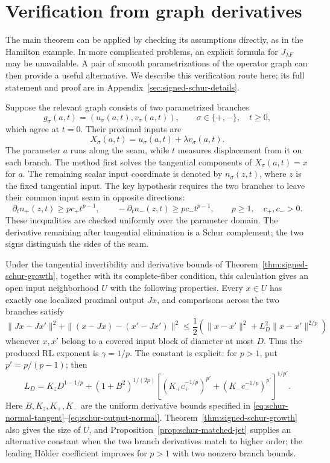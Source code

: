 \section{Verification from graph derivatives}
\label{sec:schur-seam-verifier}

The main theorem can be applied by checking its assumptions directly, as in
the Hamilton example.  In more complicated problems, an explicit formula
for \(J_{\lambda F}\) may be unavailable.  A pair of smooth parametrizations
of the operator graph can then provide a useful alternative.  We describe
this verification route here; its full statement and proof are in
Appendix~\ref{sec:signed-schur-details}.

Suppose the relevant graph consists of two parametrized branches
\[
 g_\sigma(a,t)=(u_\sigma(a,t),v_\sigma(a,t)),
 \qquad \sigma\in\{+,-\},\quad t\ge0,
\]
which agree at \(t=0\).  Their proximal inputs are
\[
 X_\sigma(a,t)=u_\sigma(a,t)+\lambda v_\sigma(a,t).
\]
The parameter \(a\) runs along the seam, while \(t\) measures displacement
from it on each branch.  The method first solves the tangential components
of \(X_\sigma(a,t)=x\) for \(a\).  The remaining scalar input coordinate
is denoted by \(n_\sigma(z,t)\), where \(z\) is the fixed tangential input.
The key hypothesis requires the two branches to leave their common input
seam in opposite directions:
\[
 \partial_t n_+(z,t)\ge p c_+t^{p-1},\qquad
 -\partial_t n_-(z,t)\ge p c_-t^{p-1},
 \qquad p\ge1,\quad c_+,c_->0.
\]
These inequalities are checked uniformly over the parameter domain.  The
derivative remaining after tangential elimination is a Schur complement;
the two signs distinguish the sides of the seam.

Under the tangential invertibility and derivative bounds of
Theorem~\ref{thm:signed-schur-growth}, together with its complete-fiber
condition, this calculation gives an open input neighborhood \(U\) with
the following properties.  Every \(x\in U\) has exactly one localized
proximal output \(Jx\), and comparisons across the two branches satisfy
\begin{equation}
 \|Jx-Jx'\|^2+
 \|(x-Jx)-(x'-Jx')\|^2
 \le\frac12\left(\|x-x'\|^2+
                     L_D^2\|x-x'\|^{2/p}\right)
 \label{eq:schur-main-J-estimate}
\end{equation}
whenever \(x,x'\) belong to a covered input block of diameter at most
\(D\).  Thus the produced RL exponent is \(\gamma=1/p\).
The constant is explicit: for \(p>1\), put \(p'=p/(p-1)\); then
\[
 L_D=K_zD^{1-1/p}+(1+B^2)^{1/(2p)}
 \left[(K_+c_+^{-1/p})^{p'}+
       (K_-c_-^{-1/p})^{p'}\right]^{1/p'}.
\]
Here \(B,K_z,K_+,K_-\) are the uniform derivative bounds specified in
\eqref{eq:schur-normal-tangent}--\eqref{eq:schur-output-normal}.
Theorem~\ref{thm:signed-schur-growth} also gives the size of \(U\), and
Proposition~\ref{prop:schur-matched-jet} supplies an alternative constant
when the two branch derivatives match to higher order; the leading
H\"older coefficient improves for \(p>1\) with two nonzero branch bounds.

